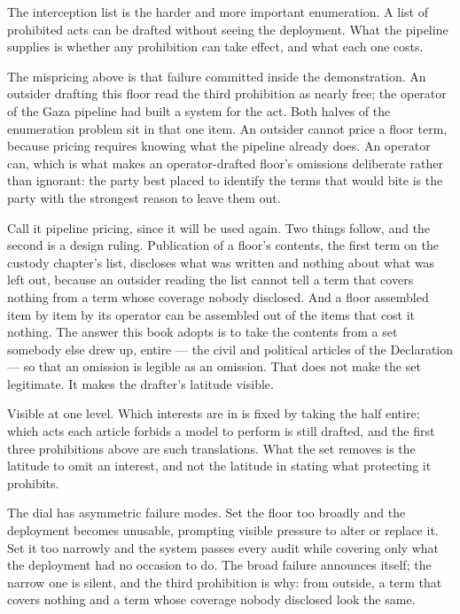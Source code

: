 
The interception list is the harder and more important enumeration. A list of prohibited acts can be drafted without seeing the deployment. What the pipeline supplies is whether any prohibition can take effect, and what each one costs.

The mispricing above is that failure committed inside the demonstration. An outsider drafting this floor read the third prohibition as nearly free; the operator of the Gaza pipeline had built a system for the act. Both halves of the enumeration problem sit in that one item. An outsider cannot price a floor term, because pricing requires knowing what the pipeline already does. An operator can, which is what makes an operator-drafted floor's omissions deliberate rather than ignorant: the party best placed to identify the terms that would bite is the party with the strongest reason to leave them out.

Call it pipeline pricing, since it will be used again. Two things follow, and the second is a design ruling. Publication of a floor's contents, the first term on the custody chapter's list, discloses what was written and nothing about what was left out, because an outsider reading the list cannot tell a term that covers nothing from a term whose coverage nobody disclosed. And a floor assembled item by item by its operator can be assembled out of the items that cost it nothing. The answer this book adopts is to take the contents from a set somebody else drew up, entire — the civil and political articles of the Declaration — so that an omission is legible as an omission. That does not make the set legitimate. It makes the drafter's latitude visible.

Visible at one level. Which interests are in is fixed by taking the half entire; which acts each article forbids a model to perform is still drafted, and the first three prohibitions above are such translations. What the set removes is the latitude to omit an interest, and not the latitude in stating what protecting it prohibits.

The dial has asymmetric failure modes. Set the floor too broadly and the deployment becomes unusable, prompting visible pressure to alter or replace it. Set it too narrowly and the system passes every audit while covering only what the deployment had no occasion to do. The broad failure announces itself; the narrow one is silent, and the third prohibition is why: from outside, a term that covers nothing and a term whose coverage nobody disclosed look the same.

